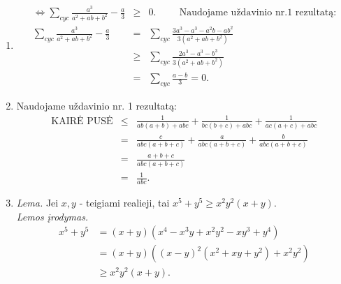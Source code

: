 \begin{enumerate}
\begin{equation*}
\begin{array}{ll}
x+y+z-k=0, & \end{array} \right. \Rightarrow \left\{ \begin{array}{ll}
d+e=a, &  \\ d+f=b, &  \\ e+f=c, &  \\ d+e+f=k, & \end{array}
\right.\tag{2}\end{equation*} Iš (1) ir (2) sudarę bendrą sistemą ir
ją išsprendę gausime $a=4$, $b=5$, $c=7$, $d=1$, $e=3$, $f=4$, $k=8$,
o $a^2+b^2+c^+d^2+e^2+f^2+k^2=244$. Taigi,
$E=(x+y-4)^2+(x+z-5)^2+(y+z-7)^2+(x-1)^2+(y-3)^2+(z-4)^2+2(x+y+z-8)^2-244+\Psi\geq
\Psi-244.$ Vadinasi, $E$ minimumas yra $\Psi-244$, o jis pasiekiamas,
kai $x=1$, $y=3$, $z=4$.
\item 
\begin{eqnarray*} \Leftrightarrow
\sum_{cyc}{\frac{a^3}{a^2+ab+b^2}-\frac{a}{3}}&\geq& 0. \hspace{1cm}
\mbox{Naudojame uždavinio nr.1 rezultatą:}\\
\sum_{cyc}{\frac{a^3}{a^2+ab+b^2}-\frac{a}{3}}&=&\sum_{cyc}{\frac{3a^3-a^3-a^2b-ab^2}{3(a^2+ab+b^2)}}\\
&\geq&\sum_{cyc}{\frac{2a^3-a^3-b^3}{3(a^2+ab+b^2)}}\\ &=&
\sum_{cyc}{\frac{a-b}{3}}=0. \end{eqnarray*}
\item 
Naudojame uždavinio nr. 1 rezultatą: \begin{eqnarray*} \mbox{KAIRĖ
PUSĖ}&\leq&\frac{1}{ab(a+b)+abc}+\frac{1}{bc(b+c)+abc}+\frac{1}{ac(a+c)+abc}\\
&=&\frac{c}{abc(a+b+c)}+\frac{a}{abc(a+b+c)}+\frac{b}{abc(a+b+c)}\\
&=&\frac{a+b+c}{abc(a+b+c)}\\ &=&\frac{1}{abc}. \end{eqnarray*}
\item 
\textit{Lema.} Jei $x,y$ - teigiami realieji, tai $x^5+y^5\geq
x^2y^2(x+y)$.\\ \noindent\textit{Lemos įrodymas.}
\begin{align*}
 x^5+y^5 &=(x+y)(x^4-x^3y+x^2y^2-xy^3+y^4)\\
         &=(x+y)((x-y)^2(x^2+xy+y^2)+x^2y^2) \\
         &\geq x^2y^2(x+y).
\end{align*}


\end{enumerate}
